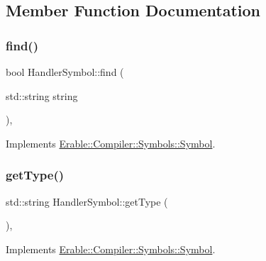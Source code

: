 \subsection{Member Function Documentation}
\mbox{\label{class_erable_1_1_compiler_1_1_symbols_1_1_handler_symbol_a04f772599f70bfad40ccb8b4facd6cb0}} 
\subsubsection{\texorpdfstring{find()}{find()}}
{\footnotesize\ttfamily bool Handler\+Symbol\+::find (\begin{DoxyParamCaption}\item[{std\+::string}]{string }\end{DoxyParamCaption})\hspace{0.3cm}{\ttfamily [override]}, {\ttfamily [virtual]}}



Implements \mbox{\hyperlink{class_erable_1_1_compiler_1_1_symbols_1_1_symbol_ac1d8b1392aef2e93bd47520a86f8617f}{Erable\+::\+Compiler\+::\+Symbols\+::\+Symbol}}.

\mbox{\label{class_erable_1_1_compiler_1_1_symbols_1_1_handler_symbol_a70340ea487e496cced8c05aa45968b56}} 
\subsubsection{\texorpdfstring{getType()}{getType()}}
{\footnotesize\ttfamily std\+::string Handler\+Symbol\+::get\+Type (\begin{DoxyParamCaption}{ }\end{DoxyParamCaption})\hspace{0.3cm}{\ttfamily [override]}, {\ttfamily [virtual]}}



Implements \mbox{\hyperlink{class_erable_1_1_compiler_1_1_symbols_1_1_symbol_a781d595ec8d14efcdbbf6d6123af1f50}{Erable\+::\+Compiler\+::\+Symbols\+::\+Symbol}}.

